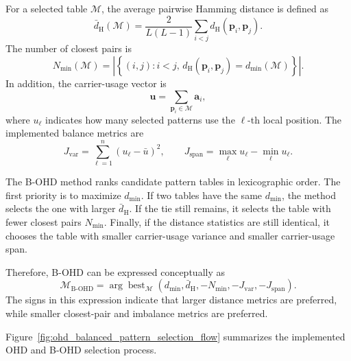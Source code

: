 For a selected table \(\mathcal{M}\), the average pairwise Hamming distance is defined as
\begin{equation}
    \bar{d}_{\mathrm{H}}(\mathcal{M})
    =
    \frac{2}{L(L-1)}
    \sum_{i<j}
    d_{\mathrm{H}}(\mathbf{p}_i,\mathbf{p}_j).
    \label{eq:average_hamming_distance}
\end{equation}
The number of closest pairs is
\begin{equation}
    N_{\min}(\mathcal{M})
    =
    \left|
    \left\{
    (i,j): i<j,\,
    d_{\mathrm{H}}(\mathbf{p}_i,\mathbf{p}_j)=d_{\min}(\mathcal{M})
    \right\}
    \right|.
    \label{eq:number_of_minimum_distance_pairs}
\end{equation}
In addition, the carrier-usage vector is
\begin{equation}
    \mathbf{u}
    =
    \sum_{\mathbf{p}_i\in\mathcal{M}}
    \mathbf{a}_i,
    \label{eq:carrier_usage_vector}
\end{equation}
where \(u_\ell\) indicates how many selected patterns use the \(\ell\)-th local position. The implemented balance metrics are
\begin{equation}
    J_{\mathrm{var}}
    =
    \sum_{\ell=1}^{n}
    \left(u_\ell-\bar{u}\right)^2,
    \qquad
    J_{\mathrm{span}}
    =
    \max_\ell u_\ell - \min_\ell u_\ell.
    \label{eq:carrier_usage_balance_metrics}
\end{equation}

The B-OHD method ranks candidate pattern tables in lexicographic order. The first priority is to maximize \(d_{\min}\). If two tables have the same \(d_{\min}\), the method selects the one with larger \(\bar{d}_{\mathrm{H}}\). If the tie still remains, it selects the table with fewer closest pairs \(N_{\min}\). Finally, if the distance statistics are still identical, it chooses the table with smaller carrier-usage variance and smaller carrier-usage span.

Therefore, B-OHD can be expressed conceptually as
\begin{equation}
    \mathcal{M}_{\mathrm{B\text{-}OHD}}
    =
    \arg\operatorname{best}_{\mathcal{M}}
    \left(
    d_{\min},
    \bar{d}_{\mathrm{H}},
    -N_{\min},
    -J_{\mathrm{var}},
    -J_{\mathrm{span}}
    \right).
    \label{eq:balanced_ohd_selection_rule}
\end{equation}
The signs in this expression indicate that larger distance metrics are preferred, while smaller closest-pair and imbalance metrics are preferred.

Figure~\ref{fig:ohd_balanced_pattern_selection_flow} summarizes the implemented OHD and B-OHD selection process.

